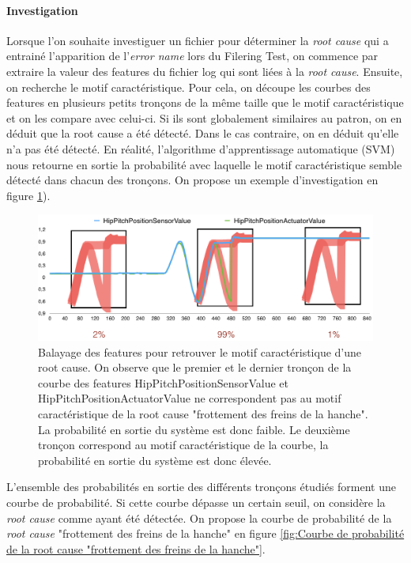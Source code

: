 \paragraph{Investigation}
Lorsque l'on souhaite investiguer un fichier pour déterminer la \emph{root cause} qui a entrainé l'apparition de l'\emph{error name} lors du Filering Test, on commence par extraire la valeur des features du fichier log qui sont liées à la \emph{root cause}. Ensuite, on recherche le motif caractéristique. Pour cela, on découpe les courbes des features en plusieurs petits tronçons de la même taille que le motif caractéristique et on les compare avec celui-ci. Si ils sont globalement similaires au patron, on en déduit que la root cause a été détecté. Dans le cas contraire, on en déduit qu'elle n'a pas été détecté. En réalité, l'algorithme d'apprentissage automatique (SVM) nous retourne en sortie la probabilité avec laquelle le motif caractéristique semble détecté dans chacun des tronçons. On propose un exemple d'investigation en figure \ref{fig:Balayage des features pour retrouver le motif caractéristique d'une root cause}).

\begin{figure}[h]
	\centering\includegraphics[width=12cm]{images/balayage_motif.png}
	\caption[Balayage des features pour retrouver le motif caractéristique d'une root cause]{Balayage des features pour retrouver le motif caractéristique d'une root cause. On observe que le premier et le dernier tronçon de la courbe des features HipPitchPositionSensorValue et  HipPitchPositionActuatorValue ne correspondent pas au motif caractéristique de la root cause "frottement des freins de la hanche". La probabilité en sortie du système est donc faible. Le deuxième tronçon correspond au motif caractéristique de la courbe, la probabilité en sortie du système est donc élevée.}
	\label{fig:Balayage des features pour retrouver le motif caractéristique d'une root cause}
\end{figure}

L'ensemble des probabilités en sortie des différents tronçons étudiés forment une courbe de probabilité. Si cette courbe dépasse un certain seuil, on considère la \emph{root cause} comme ayant été détectée. On propose la courbe de probabilité de la \emph{root cause} "frottement des freins de la hanche" en figure \ref{fig:Courbe de probabilité de la root cause "frottement des freins de la hanche"}.

